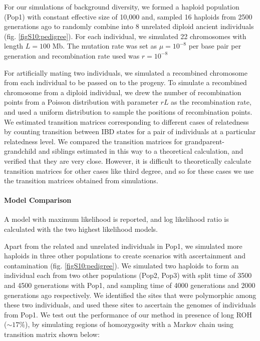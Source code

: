 \documentclass[12pt, letterpaper]{article}
\begin{document}
For our simulations of background diversity, we formed a haploid population (Pop1) with constant effective size of 10,000 and, sampled 16 haploids from 2500 generations ago to randomly combine into 8 unrelated diploid ancient individuals (fig. \ref{figS10:pedigree}). For each individual, we simulated 22 chromosomes with length $L=100$ Mb. The mutation rate was set as $\mu= 10^{-8}$ per base pair per generation and recombination rate used was $r=10^{-8}$ 

For artificially mating two individuals, we simulated a recombined chromosome from each individual to be passed on to the progeny. To simulate a recombined chromosome from a diploid individual, we drew the number of recombination points from a Poisson distribution with parameter $rL$ as the recombination rate, and used a uniform distribution to sample the positions of recombination points. We estimated transition matrices corresponding to different cases of relatedness by counting transition between IBD states for a pair of  individuals at a particular relatedness level. We compared the transition matrices for grandparent-grandchild and siblings estimated in this way to a theoretical calculation, and verified that they are very close. However, it is difficult to theoretically calculate transition matrices for other cases like third degree, and so for these cases we use the transition matrices obtained from simulations.

\paragraph{Model Comparison}
A model with maximum likelihood is reported, and log likelihood ratio is calculated with the two highest likelihood models. 

Apart from the related and unrelated individuals in Pop1, we simulated more haploids in three other populations to create scenarios with ascertainment and contamination (fig. \ref{figS10:pedigree}). We simulated two haploids to form an individual each from two other populations (Pop2, Pop3) with split time of 3500 and 4500 generations with Pop1, and sampling time of 4000 generations and 2000 generations ago respectively. We identified the sites that were polymorphic among these two individuals, and used these sites to ascertain the genomes of individuals from Pop1. We test out the performance of our method in presence of long ROH ($\sim17\%$), by simulating regions of homozygosity with a Markov chain using transition matrix shown below: 
\end{document}
